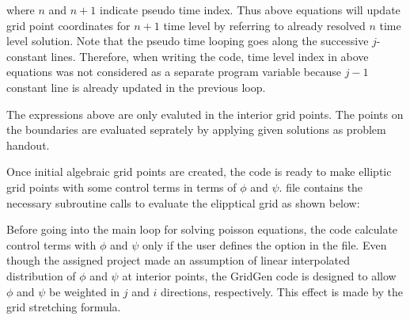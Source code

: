 \documentclass[letterpaper,10pt,english]{sphinxmanual}
\begin{document}
where \(n\) and \(n+1\) indicate pseudo time index. Thus above equations will update grid point coordinates for \(n+1\) time level by referring to already resolved \(n\) time level solution. Note that the pseudo time looping goes along the successive \(j\)-constant lines. Therefore, when writing the code, time level index in above equations was not considered as a separate program variable because \(j-1\) constant line is already updated in the previous loop.

The expressions above are only evaluted in the interior grid points. The points on the boundaries are evaluated seprately by applying given solutions as problem handout.

Once initial algebraic grid points are created, the code is ready to make elliptic grid points with some control terms in terms of \(\phi\) and \(\psi\).  file contains the necessary subroutine calls to evaluate the elipptical grid  as shown below:

\begin{sphinxVerbatim}[commandchars=\\\{\}]
     
 
 
           
           
           
           
              
\end{sphinxVerbatim}

Before going into the main loop for solving poisson equations, the code calculate control terms with \(\phi\) and \(\psi\) only if the user defines the option in the  file. Even though the assigned project made an assumption of linear interpolated distribution of \(\phi\) and \(\psi\) at interior points, the GridGen code is designed to allow \(\phi\) and \(\psi\) be weighted in \(j\) and \(i\) directions, respectively. This effect is made by the grid stretching formula.
\end{document}
